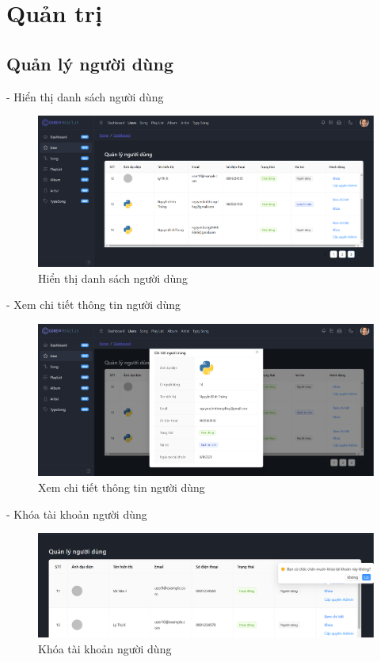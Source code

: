 \section{Quản trị}

\subsection{Quản lý người dùng}
- Hiển thị danh sách người dùng
\begin{figure}[H]
    \centering
    \includegraphics[width=1\textwidth]{imgs/chap5/ql_nguoi_dung_1.png}
    \caption{Hiển thị danh sách người dùng}
\end{figure}
- Xem chi tiết thông tin người dùng
\begin{figure}[H]
    \centering
    \includegraphics[width=1\textwidth]{imgs/chap5/ql_nguoi_dung_2.png}
    \caption{Xem chi tiết thông tin người dùng}
\end{figure}
- Khóa tài khoản người dùng
\begin{figure}[H]
    \centering
    \includegraphics[width=1\textwidth]{imgs/chap5/ql_nguoi_dung_3.png}
    \caption{Khóa tài khoản người dùng}
\end{figure}
